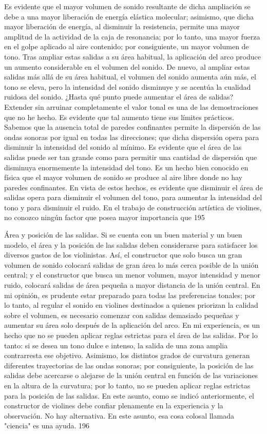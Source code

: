 Es evidente que el mayor volumen de sonido resultante de dicha ampliación se debe a una mayor liberación de energía elástica molecular; asimismo, que dicha mayor liberación de energía, al disminuir la resistencia, permite una mayor amplitud de la actividad de la caja de resonancia; por lo tanto, una mayor fuerza en el golpe aplicado al aire contenido; por consiguiente, un mayor volumen de tono.
Tras ampliar estas salidas a su área habitual, la aplicación del arco produce un aumento considerable en el volumen del sonido. De nuevo, al ampliar estas salidas más allá de su área habitual, el volumen del sonido aumenta aún más, el tono se eleva, pero la intensidad del sonido disminuye y se acentúa la cualidad ruidosa del sonido.
¿Hasta qué punto puede aumentar el área de salidas?
Extender sin arruinar completamente el valor tonal es una de las demostraciones que no he hecho. Es evidente que tal aumento tiene sus límites prácticos. Sabemos que la ausencia total de paredes confinantes permite la dispersión de las ondas sonoras por igual en todas las direcciones; que dicha dispersión opera para disminuir la intensidad del sonido al mínimo. Es evidente que el área de las salidas puede ser tan grande como para permitir una cantidad de dispersión que disminuya enormemente la intensidad del tono. Es un hecho bien conocido en física que el mayor volumen de sonido se produce al aire libre donde no hay paredes confinantes. En vista de estos hechos, es evidente que disminuir el área de salidas opera para disminuir el volumen del tono, para aumentar la intensidad del tono y para disminuir el ruido. En el trabajo de construcción artística de violines, no conozco ningún factor que posea mayor importancia que
195

Área y posición de las salidas. Si se cuenta con un buen material y un buen modelo, el área y la posición de las salidas deben considerarse para satisfacer los diversos gustos de los violinistas. Así, el constructor que solo busca un gran volumen de sonido colocará salidas de gran área lo más cerca posible de la unión central; y el constructor que busca un menor volumen, mayor intensidad y menor ruido, colocará salidas de área pequeña a mayor distancia de la unión central. En mi opinión, es prudente estar preparado para todas las preferencias tonales; por lo tanto, al regular el sonido en violines destinados a quienes priorizan la calidad sobre el volumen, es necesario comenzar con salidas demasiado pequeñas y aumentar su área solo después de la aplicación del arco. En mi experiencia, es un hecho que no se pueden aplicar reglas estrictas para el área de las salidas. Por lo tanto: si se desea un tono dulce e intenso, la salida de una zona amplia contrarresta ese objetivo. Asimismo, los distintos grados de curvatura generan diferentes trayectorias de las ondas sonoras; por consiguiente, la posición de las salidas debe acercarse o alejarse de la unión central en función de las variaciones en la altura de la curvatura; por lo tanto, no se pueden aplicar reglas estrictas para la posición de las salidas.
En este asunto, como se indicó anteriormente, el constructor de violines debe confiar plenamente en la experiencia y la observación. No hay alternativa. En este asunto, esa cosa colosal llamada "ciencia" es una ayuda.
196

